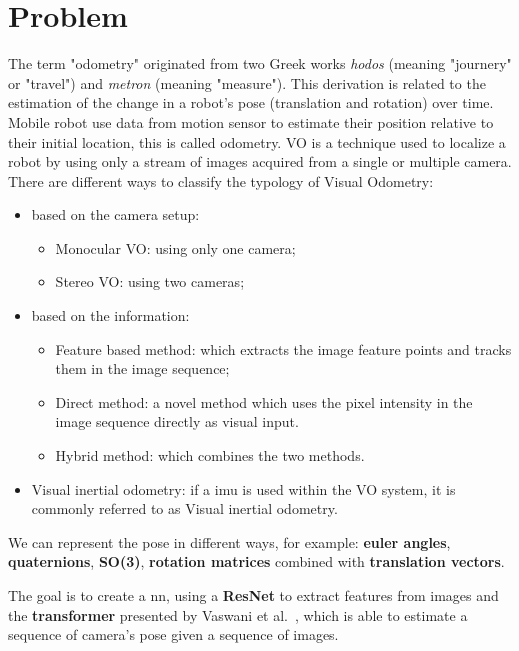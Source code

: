 \section{Problem}\label{sec:problem}
The term "odometry" originated from two Greek works \emph{hodos} (meaning "journery" or "travel") and \emph{metron} (meaning "measure").
This derivation is related to the estimation of the change in a robot's pose (translation and rotation) over time.
Mobile robot use data from motion sensor to estimate their position relative to their initial location, this is called odometry.
VO is a technique used to localize a robot by using only a stream of images acquired from a single or multiple camera.
There are different ways to classify the typology of Visual Odometry:
\begin{itemize}
    \item based on the camera setup:
        \begin{itemize}
            \item Monocular VO: using only one camera;
            \item Stereo VO: using two cameras;
        \end{itemize}
    \item based on the information:
        \begin{itemize}
            \item Feature based method: which extracts the image feature points and tracks them in the image sequence;
            \item Direct method: a novel method which uses the pixel intensity in the image sequence directly as visual input.
            \item Hybrid method: which combines the two methods.
        \end{itemize}
    \item Visual inertial odometry: if a \gls{imu} is used within the VO system, it is commonly referred to as Visual inertial odometry.
\end{itemize}
We can represent the pose in different ways, for example: \textbf{euler angles}, \textbf{quaternions}, \textbf{SO(3)}, \textbf{rotation matrices} combined with \textbf{translation vectors}.

The goal is to create a \gls{nn}, using a \textbf{ResNet} to extract features from images and the \textbf{transformer} presented by Vaswani et al.~\cite{transformer_paper}, which is able to estimate a sequence of camera's pose given a sequence of images.